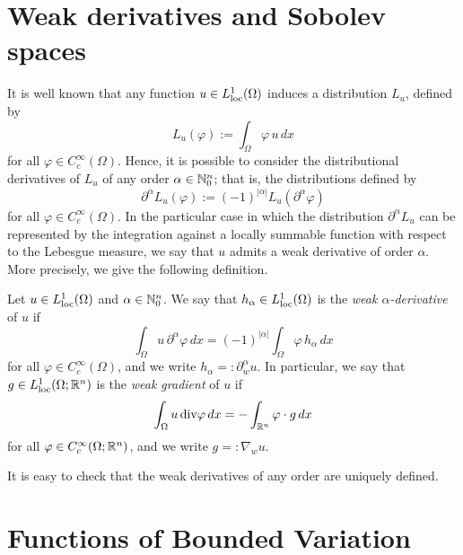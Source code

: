 \section{Weak derivatives and Sobolev spaces}

It is well known that any function $u \in L^{1}_{\rm loc}(\Omega)$ induces a distribution $L_{u}$, defined by
\begin{equation*}
L_{u}(\varphi) := \int_{\Omega} \varphi \, u \, dx
\end{equation*}
for all $\varphi \in C^{\infty}_{c}(\Omega)$. Hence, it is possible to consider the distributional derivatives of $L_{u}$ of any order $\alpha \in \mathbb{N}^{n}_{0}$; that is, the distributions defined by
\begin{equation*}
\partial^{\alpha} L_{u}(\varphi) := (-1)^{|\alpha|} L_{u}(\partial^{\alpha} \varphi)
\end{equation*}
for all $\varphi \in C^{\infty}_{c}(\Omega)$. In the particular case in which the distribution $\partial^{\alpha} L_{u}$ can be represented by the integration against a locally summable function with respect to the Lebesgue measure, we say that $u$ admits a weak derivative of order $\alpha$. More precisely, we give the following definition.

\begin{definition}
Let $u \in L^{1}_{\rm loc}(\Omega)$ and $\alpha \in \mathbb{N}^{n}_{0}$. We say that $h_{\alpha} \in L^{1}_{\rm loc}(\Omega)$ is the {\em weak $\alpha$-derivative} of $u$ if
\begin{equation*}
\int_{\Omega} u\, \partial^{\alpha} \varphi \,dx = (-1)^{|\alpha|} \int_{\Omega} \varphi \, h_{\alpha} \, dx
\end{equation*}
for all $\varphi \in C^{\infty}_{c}(\Omega)$, and we write $h_{\alpha} =: \partial^{\alpha}_{w} u$. In particular, we say that $g \in L^{1}_{\rm loc}(\Omega; \mathbb{R}^{n})$ is the {\em weak gradient} of $u$ if
\begin{equation*}
\int_{\Omega} u \, \mathrm{div} \varphi \,dx = - \int_{\mathbb{R}^{n}} \varphi \cdot g \, dx
\end{equation*}
for all $\varphi \in C^{\infty}_{c}(\Omega; \mathbb{R}^{n})$, and we write $g =: \nabla_{w} u$.
\end{definition}

It is easy to check that the weak derivatives of any order are uniquely defined.



\section{Functions of Bounded Variation}

